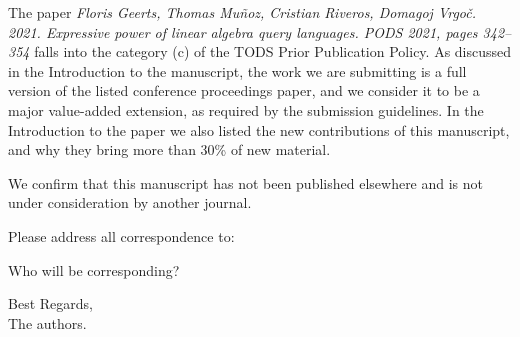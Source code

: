 \documentclass[11pt]{letter}
\begin{document}
\medskip

 The paper {\em Floris Geerts, Thomas Mu\~noz, Cristian Riveros,  Domagoj Vrgo\v{c}. 2021. 
Expressive power of linear algebra query languages. PODS 2021, pages 342--354} falls into the category (c) of the TODS Prior Publication Policy. As discussed in the Introduction to the manuscript, the work we are submitting is a full version of the listed conference proceedings paper, and we consider it to be a major value-added extension, as required by the submission guidelines. In the Introduction to the paper we also listed the new contributions of this manuscript, and why they bring more than 30\% of new material.

\medskip


We confirm that this manuscript has not been published elsewhere and is not under consideration by another journal.

Please address all correspondence to:

Who will be corresponding?

\vspace*{1cm}


Best Regards,\\
The authors.
\end{document}
